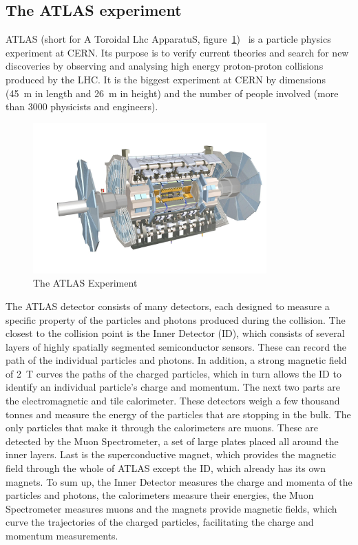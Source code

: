 \documentclass[twoside,12pt]{packages/mytustyle}  %
\begin{document}
\subsection{The ATLAS experiment}
ATLAS (short for A Toroidal Lhc ApparatuS, figure~\ref{fig:atlas})~\cite{} is a particle physics experiment at CERN. Its purpose is to verify current theories and search for new discoveries by observing and analysing high energy proton-proton collisions produced by the LHC. It is the biggest experiment at CERN by dimensions (45~m in length and 26~m in height) and the number of people involved (more than 3000 physicists and engineers).
\begin{figure}[!t]
\centering
\includegraphics[width=0.8\textwidth]{pics/atlas3}
\caption{The ATLAS Experiment \cite{Pequenao:1095924}}
\label{fig:atlas}
\end{figure}
The ATLAS detector consists of many detectors, each designed to measure a specific property of the particles and photons produced during the collision. The closest to the collision point is the Inner Detector (ID), which consists of several layers of highly spatially segmented semiconductor sensors. These can record the path of the individual particles and photons. In addition, a strong magnetic field of 2~T curves the paths of the charged particles, which in turn allows the ID to identify an individual particle's charge and momentum. The next two parts are the electromagnetic and tile calorimeter. These detectors weigh a few thousand tonnes and measure the energy of the particles that are stopping in the bulk. The only particles that make it through the calorimeters are muons. These are detected by the Muon Spectrometer, a set of large plates placed all around the inner layers. Last is the superconductive magnet, which provides the magnetic field through the whole of ATLAS except the ID, which already has its own magnets. To sum up, the Inner Detector measures the charge and momenta of the particles and photons, the calorimeters measure their energies, the Muon Spectrometer measures muons and the magnets provide magnetic fields, which curve the trajectories of the charged particles, facilitating the charge and momentum measurements.
\end{document}
